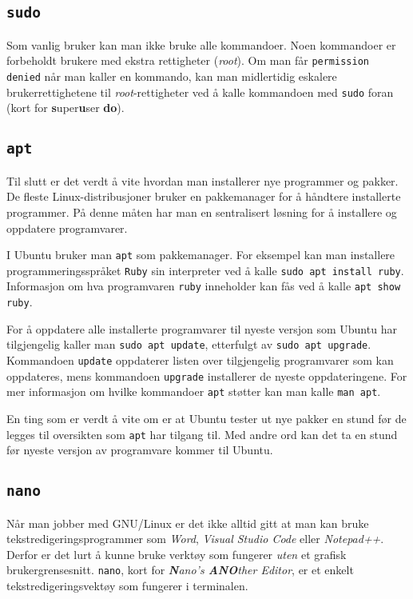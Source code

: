 \begin{alphasection}
\cprotect\subsection{\lstinline{sudo}}

Som vanlig bruker kan man ikke bruke alle kommandoer. Noen kommandoer er forbeholdt brukere med ekstra rettigheter (\textit{root}). Om man får \verb|permission denied| når man kaller en kommando, kan man midlertidig eskalere brukerrettighetene til \textit{root}-rettigheter ved å kalle kommandoen med \verb|sudo| foran (kort for \textbf{s}uper\textbf{u}ser \textbf{do}). 

\cprotect\subsection{\lstinline{apt}}

Til slutt er det verdt å vite hvordan man installerer nye programmer og pakker. De fleste Linux-distribusjoner bruker en pakkemanager for å håndtere installerte programmer. På denne måten har man en sentralisert løsning for å installere og oppdatere programvarer. 

I Ubuntu bruker man \verb|apt| som pakkemanager. For eksempel kan man installere programmeringsspråket \verb|Ruby| sin interpreter ved å kalle \verb|sudo apt install ruby|. Informasjon om hva programvaren \verb|ruby| inneholder kan fås ved å kalle \verb|apt show ruby|.

For å oppdatere alle installerte programvarer til nyeste versjon som Ubuntu har tilgjengelig kaller man \verb|sudo apt update|, etterfulgt av \verb|sudo apt upgrade|. Kommandoen \verb|update| oppdaterer listen over tilgjengelig programvarer som kan oppdateres, mens kommandoen \verb|upgrade| installerer de nyeste oppdateringene. For mer informasjon om hvilke kommandoer \verb|apt| støtter kan man kalle \verb|man apt|.

En ting som er verdt å vite om er at Ubuntu tester ut nye pakker en stund før de legges til oversikten som \verb|apt| har tilgang til. Med andre ord kan det ta en stund før nyeste versjon av programvare kommer til Ubuntu. 




\cprotect\subsection{\lstinline{nano}}
Når man jobber med GNU/Linux er det ikke alltid gitt at man kan bruke tekstredigeringsprogrammer som \textit{Word}, \textit{Visual Studio Code} eller \textit{Notepad++}. Derfor er det lurt å kunne bruke verktøy som fungerer \textit{uten} et grafisk brukergrensesnitt. \verb|nano|, kort for \textit{\textbf{N}ano's \textbf{ANO}ther Editor}, er et enkelt tekstredigeringsvektøy som fungerer i terminalen. 


\end{alphasection}
